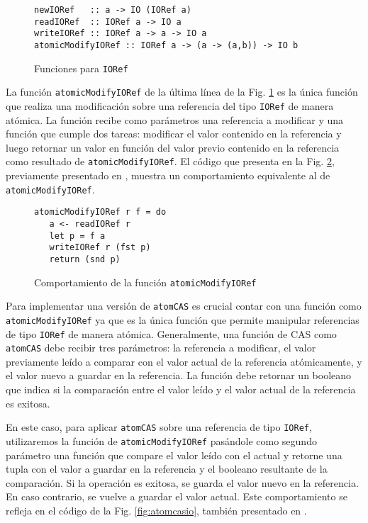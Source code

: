\begin{figure}[H]
\centering
\begin{verbatim}
newIORef   :: a -> IO (IORef a)
readIORef  :: IORef a -> IO a
writeIORef :: IORef a -> a -> IO a
atomicModifyIORef :: IORef a -> (a -> (a,b)) -> IO b
\end{verbatim}
\caption{Funciones para \texttt{IORef}}
\label{fig:ioref-interface}
\end{figure}

La función \texttt{atomicModifyIORef} de la última línea de la Fig. \ref{fig:ioref-interface} es la única función que realiza una modificación sobre una referencia del tipo \texttt{IORef} de manera atómica.
La función recibe como parámetros una referencia a modificar y una función que cumple dos tareas: modificar el valor contenido en la referencia y luego retornar un valor en función del valor previo contenido en la referencia como resultado de \texttt{atomicModifyIORef}. El código que presenta en la Fig. \ref{fig:atomicModifyIORef-behavior}, previamente presentado en \cite{linked-list}, muestra un comportamiento equivalente al de \texttt{atomicModifyIORef}.

\begin{figure}[H]
\centering
\begin{verbatim}
atomicModifyIORef r f = do
   a <- readIORef r
   let p = f a
   writeIORef r (fst p)
   return (snd p)
\end{verbatim}
\caption{Comportamiento de la función \texttt{atomicModifyIORef}}
\label{fig:atomicModifyIORef-behavior}
\end{figure}

Para implementar una versión de \texttt{atomCAS} es crucial contar con una función como \texttt{atomicModifyIORef} ya que es la única función que permite manipular referencias de tipo \texttt{IORef} de manera atómica.
Generalmente, una función de CAS como \texttt{atomCAS} debe recibir tres parámetros: la referencia a modificar, el valor previamente leído a comparar con el valor actual de la referencia atómicamente, y el valor nuevo a guardar en la referencia.
La función debe retornar un booleano que indica si la comparación entre el valor leído y el valor actual de la referencia es exitosa.

En este caso, para aplicar \texttt{atomCAS} sobre una referencia de tipo \texttt{IORef}, utilizaremos la función de \texttt{atomicModifyIORef} pasándole como segundo parámetro una función que compare el valor leído con el actual y retorne una tupla con el valor a guardar en la referencia y el booleano resultante de la comparación.
Si la operación es exitosa, se guarda el valor nuevo en la referencia.
En caso contrario, se vuelve a guardar el valor actual.
Este comportamiento se refleja en el código de la Fig. \ref{fig:atomcasio}, también presentado en \cite{linked-list}.


